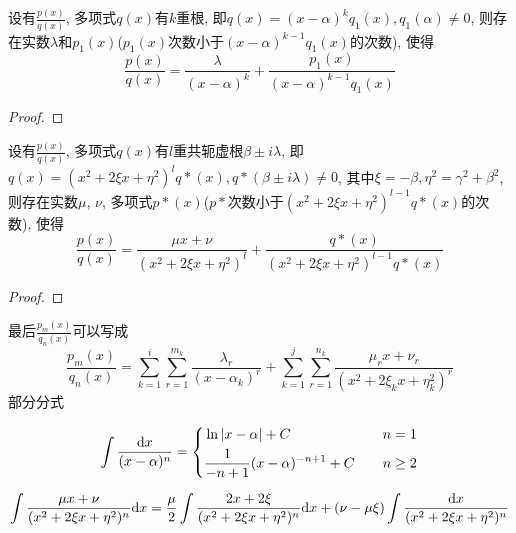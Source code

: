 \begin{theorem}
    设有$\frac{p(x)}{q(x)}$, 多项式$q(x)$有$k$重根, 即$q(x)=(x-\alpha)^kq_1(x), q_1(\alpha) \neq 0$, 则存在实数$\lambda$和$p_1(x)$($p_1(x)$次数小于$(x-\alpha)^{k-1}q_1(x)$的次数), 使得
    \begin{equation}
        \frac{p(x)}{q(x)} = \frac{\lambda}{(x-\alpha)^k} + \frac{p_1(x)}{(x-\alpha)^{k-1}q_1(x)}
    \end{equation}
\end{theorem}
\begin{proof}
    
\end{proof}

\begin{theorem}
    设有$\frac{p(x)}{q(x)}$, 多项式$q(x)$有$l$重共轭虚根$\beta\pm i\lambda$, 即$q(x) = (x^2+2\xi x+ \eta^2)^l q*(x), q*(\beta\pm i\lambda) \neq 0$, 其中$\xi = -\beta, \eta^2 = \gamma^2+\beta^2$, 则存在实数$\mu$, $\nu$, 多项式$p*(x)$($p*$次数小于$(x^2+2\xi x+\eta^2)^{l-1}q*(x)$的次数), 使得
    \begin{equation}
        \frac{p(x)}{q(x)} = \frac{\mu x + \nu}{(x^2+2\xi x+\eta^2)^l} + \frac{q*(x)}{(x^2+2\xi x+\eta^2)^{l-1}q*(x)}
    \end{equation}
\end{theorem}
\begin{proof}
    
\end{proof}

最后$\frac{p_m(x)}{q_n(x)}$可以写成
\begin{equation*}
    \frac{p_m(x)}{q_n(x)} = \sum_{k=1}^{i}\sum_{r=1}^{m_k}\frac{\lambda_r}{(x-\alpha_k)^r}+\sum_{k=1}^{j}\sum_{r=1}^{n_k}\frac{\mu_r x+ \nu_r}{(x^2+2\xi_k x +\eta_k^2)^r}
\end{equation*}
部分分式

\begin{equation*}
    \int \frac{\mathrm{d} x}{(x-\alpha)^n} = \left\{
        \begin{aligned}
            &\ln|x-\alpha| + C &\quad n = 1 \\
            &\frac{1}{-n+1}(x-\alpha)^{-n+1} + C &\quad n \ge 2
        \end{aligned}
    \right.    
\end{equation*}

\begin{equation*}
    \int \frac{\mu x + \nu}{(x^2+2\xi x+\eta^2)^n}\mathrm{d} x = \frac{\mu}{2}\int\frac{2x+2\xi}{(x^2+2\xi x+\eta^2)^n} \mathrm{d} x + (\nu-\mu \xi)\int\frac{\mathrm{d} x}{(x^2+2\xi x+\eta^2)^n}
\end{equation*}

